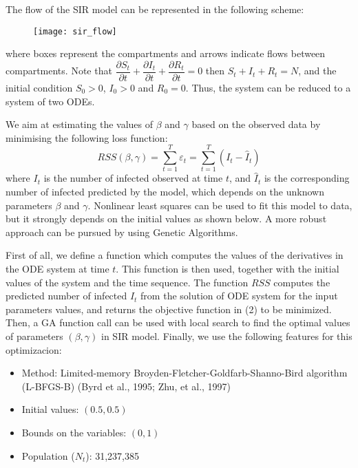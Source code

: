 \documentclass[12pt]{article}
\begin{document}
The flow of the SIR model can be represented in the following scheme:
\clearpage

\begin{figure}[h]
\centering
\texttt{[image: sir\_flow]}
\end{figure}
where boxes represent the compartments and arrows indicate flows between compartments. Note that $\dfrac{\partial S_t}{\partial t}+\dfrac{\partial I_t}{\partial t}+\dfrac{\partial R_t}{\partial t}=0$ then $S_t+I_t+R_t=N$, and the initial condition $S_0>0$, $I_0>0$ and $R_0=0$. Thus, the system can be reduced to a system of two ODEs.

We aim at estimating the values of $\beta$ and $\gamma$ based on the observed data by minimising the following loss function:
\begin{equation}
RSS(\beta,\gamma) = \sum_{t=1}^{T} \varepsilon_t =\sum_{t=1}^{T}\left ( I_t-\hat{I}_t \right )
\end{equation}
where $I_t$ is the number of infected observed at time $t$, and $\hat{I}_t$ is the corresponding number of infected predicted by the model, which depends on the unknown parameters $\beta$ and $\gamma$. Nonlinear least squares can be used to fit this model to data, but it strongly depends on the initial values as shown below. A more robust approach can be pursued by using Genetic Algorithms.

First of all, we define a function which computes the values of the derivatives in the ODE system at time $t$. This function is then used, together with the initial values of the system and the time sequence. The function $RSS$ computes the predicted number of infected $\hat{I}_t$ from the solution of ODE system for the input parameters values, and returns the objective function in (2) to be minimized. Then, a GA function call can be used with local search to find the optimal values of parameters $(\beta,\gamma)$ in SIR model. Finally, we use the following features for this optimizacion:
\begin{itemize}
\setlength\itemsep{0.01em}
\item Method: Limited-memory Broyden-Fletcher-Goldfarb-Shanno-Bird algorithm (L-BFGS-B) (Byrd et al., 1995; Zhu, et al., 1997)
\item Initial values: $(0.5,0.5)$
\item Bounds on the variables: $(0,1)$
\item Population ($N_t$): 31,237,385
\end{itemize}
\end{document}
